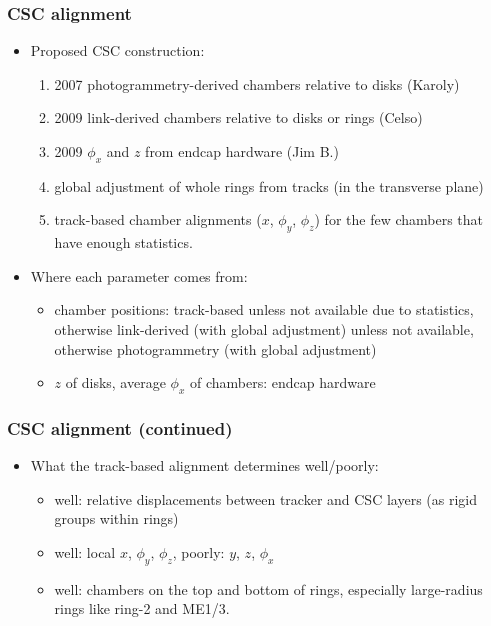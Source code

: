 \documentclass[compress]{beamer}
\begin{document}
\begin{frame}
\frametitle{CSC alignment}

\begin{itemize}
\item Proposed CSC construction:
\begin{enumerate}
\item 2007 photogrammetry-derived chambers relative to disks (Karoly)
\item 2009 link-derived chambers relative to disks or rings (Celso)
\item 2009 $\phi_x$ and $z$ from endcap hardware (Jim B.)
\item global adjustment of whole rings from tracks (in the transverse plane)
\item track-based chamber alignments ($x$, $\phi_y$, $\phi_z$) for the few chambers
that have enough statistics.
\end{enumerate}

\item Where each parameter comes from:
\begin{itemize}
\item chamber positions: track-based unless not available due to
statistics, otherwise link-derived (with global adjustment) unless not
available, otherwise photogrammetry (with global adjustment)
\item $z$ of disks, average $\phi_x$ of chambers: endcap hardware
\end{itemize}

\end{itemize}
\end{frame}

\begin{frame}
\frametitle{CSC alignment (continued)}

\begin{itemize}
\item What the track-based alignment determines well/poorly:
\begin{itemize}
\item well: relative displacements between tracker and CSC layers (as
rigid groups within rings)
\item well: local $x$, $\phi_y$, $\phi_z$, poorly: $y$, $z$, $\phi_x$
\item well: chambers on the top and bottom of rings, especially
large-radius rings like ring-2 and ME1/3.
\end{itemize}

\end{itemize}
\end{frame}
\end{document}
